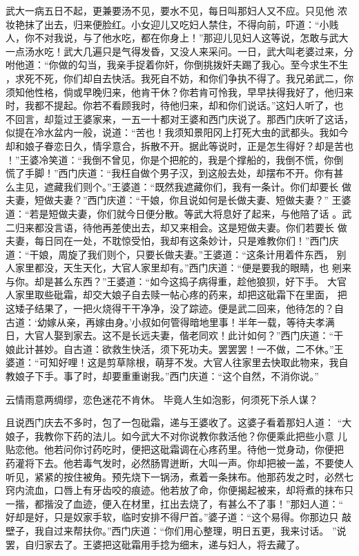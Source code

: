 武大一病五日不起，更兼要汤不见，要水不见，每日叫那妇人又不应。只见他
浓妆艳抹了出去，归来便脸红。小女迎儿又吃妇人禁住，不得向前，吓道：“小贱
人，你不对我说，与了他水吃，都在你身上！”那迎儿见妇人这等说，怎敢与武大
一点汤水吃！武大几遍只是气得发昏，又没人来采问。一日，武大叫老婆过来，分
咐他道：“你做的勾当，我亲手捉着你奸，你倒挑拨奸夫踢了我心。至今求生不生
，求死不死，你们却自去快活。我死自不妨，和你们争执不得了。我兄弟武二，你
须知他性格，倘或早晚归来，他肯干休？你若肯可怜我，早早扶得我好了，他归来
时，我都不提起。你若不看顾我时，待他归来，却和你们说话。”这妇人听了，也
不回言，却踅过王婆家来，一五一十都对王婆和西门庆说了。那西门庆听了这话，
似提在冷水盆内一般，说道：“苦也！我须知景阳冈上打死大虫的武都头。我如今
却和娘子眷恋日久，情孚意合，拆散不开。据此等说时，正是怎生得好？却是苦也
！”王婆冷笑道：“我倒不曾见，你是个把舵的，我是个撑船的，我倒不慌，你倒
慌了手脚！”西门庆道：“我枉自做个男子汉，到这般去处，却摆布不开。你有甚
么主见，遮藏我们则个。”王婆道：“既然我遮藏你们，我有一条计。你们却要长
做夫妻，短做夫妻？”西门庆道：“干娘，你且说如何是长做夫妻、短做夫妻？”
王婆道：“若是短做夫妻，你们就今日便分散。等武大将息好了起来，与他陪了话
。武二归来都没言语，待他再差使出去，却又来相会。这是短做夫妻。你们若要长
做夫妻，每日同在一处，不耽惊受怕，我却有这条妙计，只是难教你们！”西门庆
道：“干娘，周旋了我们则个，只要长做夫妻。”王婆道：“这条计用着件东西，
别人家里都没，天生天化，大官人家里却有。”西门庆道：“便是要我的眼睛，也
剜来与你。却是甚么东西？”王婆道：“如今这捣子病得重，趁他狼狈，好下手。
大官人家里取些砒霜，却交大娘子自去赎一帖心疼的药来，却把这砒霜下在里面，
把这矮子结果了，一把火烧得干干净净，没了踪迹。便是武二回来，他待怎的？自
古道：‘幼嫁从亲，再嫁由身。’小叔如何管得暗地里事！半年一载，等待夫孝满
日，大官人娶到家去。这不是长远夫妻，偕老同欢！此计如何？”西门庆道：“干
娘此计甚妙。自古道：欲救生快活，须下死功夫。罢罢罢！一不做，二不休。”王
婆道：“可知好哩！这是剪草除根，萌芽不发。大官人往家里去快取此物来，我自
教娘子下手。事了时，却要重重谢我。”西门庆道：“这个自然，不消你说。”

云情雨意两绸缪，恋色迷花不肯休。
毕竟人生如泡影，何须死下杀人谋？

且说西门庆去不多时，包了一包砒霜，递与王婆收了。这婆子看着那妇人道：
“大娘子，我教你下药的法儿。如今武大不对你说教你救活他？你便乘此把些小意
儿贴恋他。他若问你讨药吃时，便把这砒霜调在心疼药里。待他一觉身动，你便把
药灌将下去。他若毒气发时，必然肠胃迸断，大叫一声。你却把被一盖，不要使人
听见，紧紧的按住被角。预先烧下一锅汤，煮着一条抹布。他那药发之时，必然七
窍内流血，口唇上有牙齿咬的痕迹。他若放了命，你便揭起被来，却将煮的抹布只
一揩，都揩没了血迹，便入在材里，扛出去烧了，有甚么不了事！”那妇人道：“
好却是好，只是奴家手软，临时安排不得尸首。”婆子道：“这个易得。你那边只
敲壁子，我自过来帮扶你。”西门庆道：“你们用心整理，明日五更，我来讨话。
”说罢，自归家去了。王婆把这砒霜用手捻为细末，递与妇人，将去藏了。

